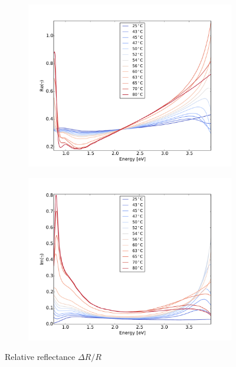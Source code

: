 \begin{figure}
    \begin{subfigure}[b]{0.49\textwidth}
        \centering
        \includegraphics[width=\textwidth]{Results/Sim1/re_gamma.pdf}
        \caption{}
        \label{fig:2}
    \end{subfigure}
    \begin{subfigure}[b]{0.49\textwidth}
        \centering
        \includegraphics[width=\textwidth]{Results/Sim1/im_gamma.pdf}
        \caption{}
        \label{fig:2}
    \end{subfigure}
    \caption{Relative reflectance $\Delta R/R$}
    \label{fig:}
\end{figure}
